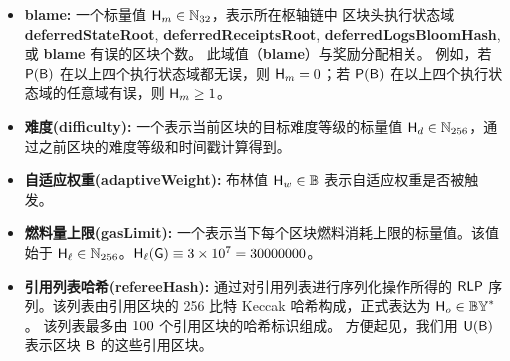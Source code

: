 \begin{itemize}[nosep]
	\item {\bf blame:} 一个标量值 $\textsf{H}_{m}\in\mathbb{N}_{32}$，表示所在枢轴链中
	区块头执行状态域 {\bf deferredStateRoot}, {\bf deferredReceiptsRoot}, {\bf deferredLogsBloomHash}, 或 {\bf blame} 有误的区块个数。
	此域值（{\bf blame}）与奖励分配相关。
	例如，若 $\mathsf{P}{\left({\textsf{B}} \right)}$ 在以上四个执行状态域都无误，则 $\textsf{H}_{m}=0$；若 $\mathsf{P}{\left({\textsf{B}} \right)}$ 在以上四个执行状态域的任意域有误，则 $\textsf{H}_{m} \ge 1$。

	\item {\bf 难度(difficulty):} 一个表示当前区块的目标难度等级的标量值 $\textsf{H}_d\in\mathbb{N}_{256}$，通过之前区块的难度等级和时间戳计算得到。

	\item {\bf 自适应权重(adaptiveWeight):} 布林值 $\textsf{H}_w\in\mathbb{B}$ 表示自适应权重是否被触发。

	\item {\bf 燃料量上限(gasLimit):} 一个表示当下每个区块燃料消耗上限的标量值。该值始于 $\textsf{H}_{\ell}\in\mathbb{N}_{256}$。$\textsf{H}_{\ell}(\textsf{G})\equiv 3\times 10^7=30000000$。

	\item {\bf 引用列表哈希(refereeHash):} 通过对引用列表进行序列化操作所得的 $\mathsf{RLP}$ 序列。该列表由引用区块的 256 比特 Keccak 哈希构成，正式表达为 $\textsf{H}_o \in\mathbb{BY}^*$。
	该列表最多由 $100$ 个引用区块的哈希标识组成。
	方便起见，我们用 $\textsf{U}(\textsf{B})$ 表示区块 $\textsf{B}$ 的这些引用区块。
	

\end{itemize}
